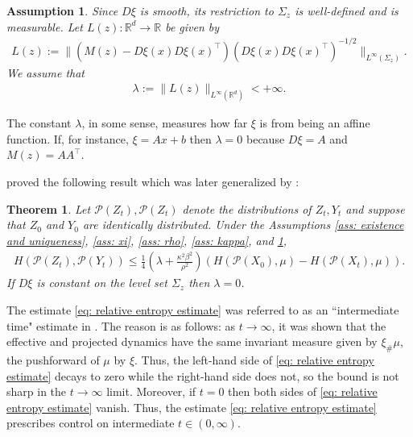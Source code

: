 \documentclass[reqno, 12pt]{article}
\newtheorem{theorem}{Theorem}
\newtheorem{assumption}{Assumption}
\newtheorem{remark}{Remark}
\begin{document}
\begin{assumption}
\label{ass: lambda}
    Since $D\xi$ is smooth, its restriction to $\Sigma_z$ is well-defined and is measurable. Let $L(z): \mathbb{R}^d \to \mathbb{R}$ be given by 
    \begin{align}
        L(z) := \|(M(z) - D\xi(x)D\xi(x)^{\top})(D\xi(x)D\xi(x)^{\top})^{-1/2}\|_{L^{\infty}(\Sigma_{z})}.
    \end{align}
    We assume that
    \begin{align}
         \lambda := \|L(z)\|_{L^{\infty}(\mathbb{R}^d)} < +\infty. 
    \end{align} 
\end{assumption}
The constant $\lambda$, in some sense, measures how far $\xi$ is from being an affine function. If, for instance, $\xi = Ax + b$ then $\lambda = 0$ because $D\xi = A$ and $M(z) = AA^\top$. 

\parencite{legoll2010effective} proved the following result which was later generalized by \parencite{duong2018quantification}:

\begin{theorem}
\label{thm: duong + legoll} Let $\mathcal{P}(Z_t), \mathcal{P}(Z_t)$ denote the distributions of $Z_t, Y_t$ and suppose that $Z_0$ and $Y_0$ are identically distributed. Under the Assumptions \ref{ass: existence and uniqueness}, \ref{ass: xi}, \ref{ass: rho}, \ref{ass: kappa}, and \ref{ass: lambda},
\begin{align}
    H(\mathcal{P}(Z_t), \mathcal{P}(Y_t)) \leq \frac{1}{4}\left(\lambda + \frac{\kappa^{2}\beta^{2}}{\rho^2}\right)\left(H(\mathcal{P}(X_0), \mu) - H(\mathcal{P}(X_t), \mu)\right). \label{eq: relative entropy estimate}
\end{align}
If $D\xi$ is constant on the level set $\Sigma_z$ then $\lambda = 0$. 
\end{theorem}

The estimate \eqref{eq: relative entropy estimate} was referred to as an ``intermediate time" estimate in \cite{legoll2010effective}. The reason is as follows: as $t \to \infty$, it was shown that the effective and projected dynamics have the same invariant measure given by $\xi_{\#}\mu$, the pushforward of $\mu$ by $\xi$. Thus, the left-hand side of \eqref{eq: relative entropy estimate} decays to zero while the right-hand side does not, so the bound is not sharp in the $t \to \infty$ limit. Moreover, if $t = 0$ then both sides of \eqref{eq: relative entropy estimate} vanish. Thus, the estimate \eqref{eq: relative entropy estimate} prescribes control on intermediate $t \in (0, \infty)$. 
\end{document}
